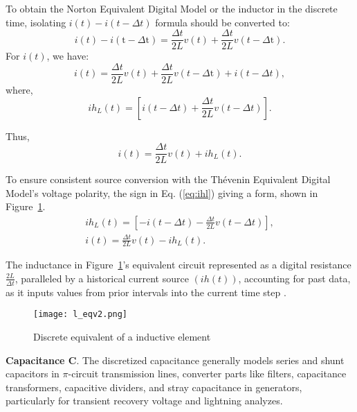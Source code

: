 To obtain the Norton Equivalent Digital Model or the inductor in the discrete time, isolating $i(t)-i(t-\Delta t)$ formula should be converted to:
\begin{equation}
    i(t)-i(\mathrm{t}-\Delta \mathrm{t})=\frac{\Delta t}{2 L} v(t)+\frac{\Delta t}{2 L} v(t-\Delta \mathrm{t}).
\end{equation}
For $i(t)$, we have:
\begin{equation}
    i(t)=\frac{\Delta t}{2 L} v(t)+\frac{\Delta t}{2 L} v(t-\Delta \mathrm{t})+i(t-\Delta t),
\end{equation}
where,
\begin{equation}
    i h_{L}(t)=\left[i(t-\Delta t)+\frac{\Delta t}{2 L} v(t-\Delta t)\right].
    \label{eq:ihl}
\end{equation}

Thus,
\begin{equation}
    i(t)=\frac{\Delta t}{2 L} v(t)+i h_{L}(t).
\end{equation}

To ensure consistent source conversion with the Thévenin Equivalent Digital Model's voltage polarity, the sign in Eq. (\ref{eq:ihl}) giving a form, shown in Figure~\cref{fig:l_eqv2}.
\begin{equation}
\begin{array}{c}
    \displaystyle i h_{L}(t)=\left[-i(t-\Delta t)-\frac{\Delta t}{2 L} v(t-\Delta t)\right],\\[1em]
    \displaystyle i(t)=\frac{\Delta t}{2 L} v(t)-i h_{L}(t).
    \end{array}
\end{equation}

The inductance in Figure~\cref{fig:l_eqv2}'s equivalent circuit represented as a digital resistance $\frac{2 L}{\Delta t}$, paralleled by a historical current source $(ih(t))$, accounting for past data, as it inputs values from prior intervals into the current time step \autocite{de2022introduction}.

\begin{figure}[htbp]
    \centering
    \texttt{[image: l\_eqv2.png]}
    \caption{Discrete equivalent of a inductive element}
    \label{fig:l_eqv2}
\end{figure}

\textbf{Capacitance C}. The discretized capacitance generally models series and shunt capacitors in $\pi$-circuit transmission lines, converter parts like filters, capacitance transformers, capacitive dividers, and stray capacitance in generators, particularly for transient recovery voltage and lightning analyzes.

